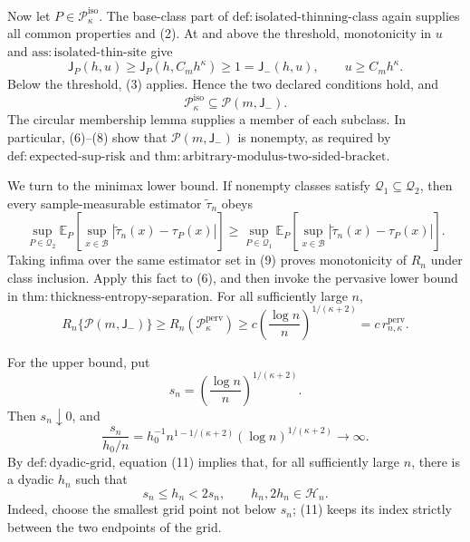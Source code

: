Now let \(P\in\mathcal P_{\kappa}^{\mathrm{iso}}\).  The base-class part of \(\mathrm{def:isolated\text{-}thinning\text{-}class}\) again supplies all common properties and (2).  At and above the threshold, monotonicity in \(u\) and \(\mathrm{ass:isolated\text{-}thin\text{-}site}\) give
\[
 \mathsf J_P(h,u)
 \ge \mathsf J_P(h,C_mh^\kappa)
 \ge1=\mathsf J_{-}(h,u),
 \qquad u\ge C_mh^\kappa. \tag{7}
\]
Below the threshold, (3) applies.  Hence the two declared conditions hold, and
\[
 \mathcal P_{\kappa}^{\mathrm{iso}}
 \subseteq\mathcal P(m,\mathsf J_{-}). \tag{8}
\]
The circular membership lemma supplies a member of each subclass.  In particular, (6)--(8) show that \(\mathcal P(m,\mathsf J_{-})\) is nonempty, as required by \(\mathrm{def:expected\text{-}sup\text{-}risk}\) and \(\mathrm{thm:arbitrary\text{-}modulus\text{-}two\text{-}sided\text{-}bracket}\).

We turn to the minimax lower bound.  If nonempty classes satisfy \(\mathcal Q_1\subseteq\mathcal Q_2\), then every sample-measurable estimator \(\widetilde\tau_n\) obeys
\[
 \sup_{P\in\mathcal Q_2}
 \mathbb E_P\!\left[
   \sup_{x\in\mathcal B}|\widetilde\tau_n(x)-\tau_P(x)|
 \right]
 \ge
 \sup_{P\in\mathcal Q_1}
 \mathbb E_P\!\left[
   \sup_{x\in\mathcal B}|\widetilde\tau_n(x)-\tau_P(x)|
 \right]. \tag{9}
\]
Taking infima over the same estimator set in (9) proves monotonicity of \(R_n\) under class inclusion.  Apply this fact to (6), and then invoke the pervasive lower bound in \(\mathrm{thm:thickness\text{-}entropy\text{-}separation}\).  For all sufficiently large \(n\),
\[
 R_n\{\mathcal P(m,\mathsf J_{-})\}
 \ge R_n(\mathcal P_{\kappa}^{\mathrm{perv}})
 \ge c\left(\frac{\log n}{n}\right)^{1/(\kappa+2)}
 =c\,r_{n,\kappa}^{\mathrm{perv}}. \tag{10}
\]

For the upper bound, put
\[
 s_n=\left(\frac{\log n}{n}\right)^{1/(\kappa+2)}.
\]
Then \(s_n\downarrow0\), and
\[
 \frac{s_n}{h_0/n}
 =h_0^{-1}n^{1-1/(\kappa+2)}(\log n)^{1/(\kappa+2)}
 \longrightarrow\infty. \tag{11}
\]
By \(\mathrm{def:dyadic\text{-}grid}\), equation (11) implies that, for all sufficiently large \(n\), there is a dyadic \(h_n\) such that
\[
 s_n\le h_n<2s_n,
 \qquad h_n,2h_n\in\mathcal H_n. \tag{12}
\]
Indeed, choose the smallest grid point not below \(s_n\); (11) keeps its index strictly between the two endpoints of the grid.


